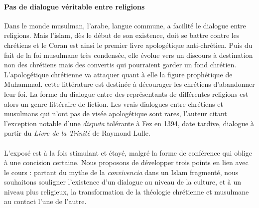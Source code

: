 \paragraph{Pas de dialogue véritable entre religions} Dans le monde musulman, l'arabe, langue commune, a facilité le dialogue entre religions.  Mais l'islam,   dès le début de son existence, doit se battre contre les chrétiens et le Coran est ainsi le premier livre apologétique anti-chrétien. Puis du fait de la foi musulmane  très condensée, elle évolue vers un discours à destination non des chrétiens mais des convertis qui pourraient garder un fond chrétien. L'apologétique chrétienne va attaquer quant à elle la figure prophétique de Muhammad. cette littérature est destinée à décourager les chrétiens d'abandonner leur foi. La forme du dialogue entre des représentants de différentes religions est alors un genre littéraire de fiction. Les vrais dialogues entre chrétiens et musulmans qui n'ont pas de visée apologétique sont rares, l'auteur citant l'exception notable d'une \textit{disputa} tolérante à Fez en 1394, date tardive, dialogue à partir du \textit{Livre de la Trinité} de Raymond Lulle.

\paragraph{}
L'exposé est à la fois stimulant et étayé, malgré la forme de conférence qui oblige à une concision certaine. Nous proposons de développer trois points en lien avec le cours : partant du mythe de la \textit{convivencia} dans un Islam fragmenté, nous souhaitons souligner l'existence d'un dialogue au niveau de la culture, et à un niveau plus religieux, la transformation de la théologie chrétienne et musulmane au contact l'une de l'autre.

